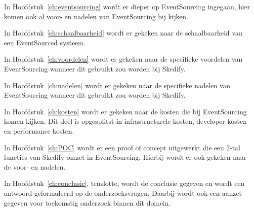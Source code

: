 In Hoofdstuk~\ref{ch:eventsourcing} wordt er dieper op EventSourcing ingegaan, hier komen ook al voor- en nadelen van EventSourcing bij kijken.

In Hoofdstuk~\ref{ch:schaalbaarheid} wordt er gekeken naar de schaalbaarheid van een EventSourced systeem.

In Hoofdstuk~\ref{ch:voordelen} wordt er gekeken naar de specifieke voordelen van EventSourcing wanneer dit gebruikt zou worden bij Skedify.

In Hoofdstuk~\ref{ch:nadelen} wordt er gekeken naar de specifieke nadelen van EventSourcing wanneer dit gebruikt zou worden bij Skedify.

In Hoofdstuk~\ref{ch:kosten} wordt er gekeken naar de kosten die bij EventSourcing komen kijken. Dit deel is opgesplitst in infrastructurele kosten, developer kosten en performance kosten.

In Hoofdstuk~\ref{ch:POC} wordt er een proof of concept uitgewerkt die een 2-tal functies van Skedify omzet in EventSourcing. Hierbij wordt er ook gekeken naar de voor- en nadelen.

In Hoofdstuk~\ref{ch:conclusie}, tenslotte, wordt de conclusie gegeven en wordt een antwoord geformuleerd op de onderzoeksvragen. Daarbij wordt ook een aanzet gegeven voor toekomstig onderzoek binnen dit domein.

